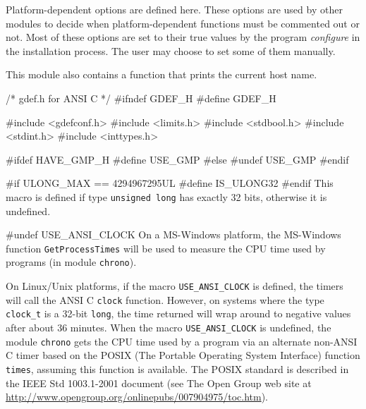 
Platform-dependent options are defined here.
These options are used by other modules to decide when
platform-dependent functions must be commented out or not.
Most of these options are set to their true values by the program
{\it configure} in the installation process. The user may choose
to set some of them manually.
\iffalse
Each option must either be left undefined (i.e., the corresponding
macro is put to false, using ``\texttt{\#undef})
or can be given its proper value (using ``\texttt{\#define} commands).
An option can be defined only under certain conditions.
For example, \texttt{USE\_GMP} can be defined only if GMP
is available, and so on.
\fi
This module also contains a function that prints the current host name.

\code\hide
/* gdef.h  for ANSI C */
#ifndef GDEF_H
#define GDEF_H

#include <gdefconf.h>
#include <limits.h>
#include <stdbool.h>
#include <stdint.h>
#include <inttypes.h>

#ifdef HAVE_GMP_H
#define USE_GMP
#else
#undef USE_GMP
#endif
\endhide
\endcode


\hide
\code


#if ULONG_MAX == 4294967295UL
#define IS_ULONG32
#endif
\endcode
  \tab This macro is defined if type \texttt {unsigned long} has
  exactly 32 bits, otherwise it is undefined.
 \endtab
\endhide
\code


#undef USE_ANSI_CLOCK
\endcode
  \tab On a MS-Windows platform,
  the MS-Windows function \texttt{GetProcessTimes} will be used to measure
  the CPU time used by programs (in module \texttt{chrono}).

  On Linux/Unix platforms, if the macro
  \texttt{USE\_ANSI\_CLOCK} is defined, the timers %
  will call the ANSI C  \texttt{clock} function. However, on systems
  where the type \texttt{clock\_t} is a 32-bit \texttt{long},
  the time returned
  will wrap around to negative values after about 36 minutes.
  When the macro \texttt{USE\_ANSI\_CLOCK} is undefined, the
  module \texttt{chrono} gets the CPU time used by a program via an
  alternate non-ANSI C timer
  based on the POSIX (The Portable Operating System Interface)
  function \texttt{times}, assuming this function is available. The POSIX
  standard is described in the IEEE Std 1003.1-2001 document (see
  The Open Group web site at
  \url{http://www.opengroup.org/onlinepubs/007904975/toc.htm}).
 \endtab
\code


